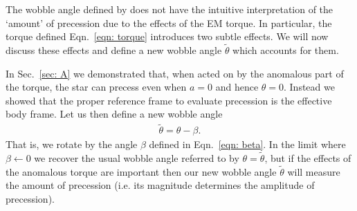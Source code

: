 \documentclass[../full_thesis/full_thesis.tex]{subfiles}
\newcommand{\wobbleangle}{\tilde{\theta}}
\begin{document}
The wobble angle defined by \citet{Jones2001} does not have the intuitive
interpretation of the `amount' of precession due to the effects of the EM
torque.  In particular, the torque defined Eqn.~\eqref{eqn: torque} introduces
two subtle effects. We will now discuss these effects and define a new wobble
angle $\wobbleangle$ which accounts for them.

In Sec.~\ref{sec: A} we demonstrated that, when acted on by the anomalous part
of the torque, the star can precess even when $a=0$ and hence $\theta=0$.
Instead we showed that the proper reference frame to evaluate precession is the
effective body frame. Let us then define a new wobble angle
\begin{align}
\wobbleangle = \theta - \beta.
\label{eqn: wobble angle}
\end{align}
That is, we rotate by the angle $\beta$ defined in Eqn.~\eqref{eqn: beta}. In
the limit where $\beta \leftarrow 0$ we recover the usual wobble angle referred
to by \citet{Jones2001} $\theta = \wobbleangle$, but if the effects of the
anomalous torque are important then our new wobble angle $\wobbleangle$ will
measure the amount of precession (i.e. its magnitude determines the amplitude
of precession).

%
\end{document}
